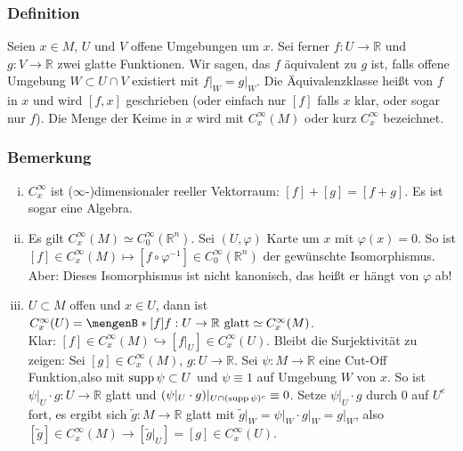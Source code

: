 \subsubsection{Definition}
\label{ssub:146}
Seien $x \in M$, $U$ und $V$ offene Umgebungen um $x$. Sei ferner $f:U\to \mathds{R}$ und $g:V\to \mathds{R}$ zwei glatte Funktionen. Wir sagen, das $f$ äquivalent zu $g$ ist, falls offene Umgebung $W\subset U\cap V$ existiert mit $f\vert_W = g\vert_W$. Die Äquivalenzklasse heißt  von $f$ in $x$ und wird $[f,x]$ geschrieben (oder einfach nur $[f]$ falls $x$ klar, oder sogar nur $f$). Die Menge der Keime in $x$ wird mit $C^\infty_x (M)$ oder kurz $C^\infty_x$ bezeichnet.

\subsubsection{Bemerkung}
\label{ssub:147}
\begin{enumerate}[(i)]
\item $C^\infty_x$ ist ($\infty$-)dimensionaler reeller Vektorraum: $[f]+[g]=[f+g]$. Es ist sogar eine Algebra.
\item 
{}
Es gilt $C_x^\infty (M) \simeq C_0^\infty (\mathds{R}^n)$. Sei $(U,\varphi)$ Karte um $x$ mit $\varphi(x) = 0$. So ist $[f]\in C_x^\infty (M) \mapsto [f\circ \varphi^{-1}]\in C_0^\infty (\mathds{R}^n)$ der gewünschte Isomorphismus.
Aber: Dieses Isomorphismus ist nicht kanonisch, das heißt er hängt von $\varphi$ ab!
\item $U\subset M$ offen und $x\in U$, dann ist $C_x^\infty(U) = \set[[f]]{f:U\to \mathds{R}\ \text{glatt}} \simeq C_x^\infty (M)$.\\
Klar: $[f]\in C_x^\infty (M) \hookrightarrow [f\vert_U]\in C_x^\infty (U)$. Bleibt die Surjektivität zu zeigen: Sei $[g]\in C_x^\infty (M)$, $g:U\to \mathds{R}$. Sei $\psi: M \to \mathds{R}$ eine Cut-Off Funktion,also mit $\operatorname{supp} \psi \subset U$ und $\psi \equiv 1$ auf Umgebung $W$ von $x$. So ist $\psi\vert_U \cdot g: U \to \mathds{R}$ glatt und $(\psi\vert_U \cdot g)\vert_{U\cap (\operatorname{supp} \psi)^c} \equiv 0$. Setze $\psi\vert_U \cdot g$ durch $0$ auf $U^c$ fort, es ergibt sich $\tilde{g}:M\to \mathds{R}$ glatt mit $\tilde{g}\vert_W = \psi\vert_W \cdot g\vert_W = g\vert_W$, also $[\tilde{g}]\in C_x^\infty (M) \to [\tilde{g}\vert_U] = [g] \in C_x^\infty(U)$.
\end{enumerate}

